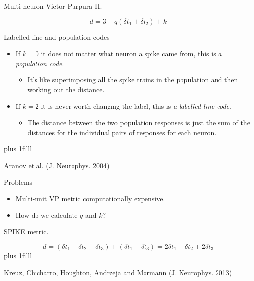 \documentclass{beamer}
\newcommand{\btVFill}{\vskip0pt plus 1filll}
\begin{document}
\begin{frame}{Multi-neuron Victor-Purpura II.}
\color{reddish}

\color{dark}
\[
d=3+q(\delta t_1+\delta t_2)+k
\]
\end{frame}



\begin{frame}{Labelled-line and population codes}
\begin{itemize}
\item If \color{dark}$k=0$\color{black}{} it does not matter what neuron a spike came from, this is \textsl{a population code}.
\begin{itemize}
\item It's like superimposing all the spike trains in the population and then working out the distance.
\end{itemize}
\item If \color{dark}$k=2$\color{black}{} it is never worth changing the label, this is \textsl{a labelled-line code}.
\begin{itemize}
\item The distance between the two population responses is just the sum of the distances for the individual pairs of responses for each neuron.
\end{itemize}
\end{itemize}
\btVFill
\begin{flushright}
\tiny{Aranov et al. (J. Neurophys. 2004)}
\end{flushright}
\end{frame}

\begin{frame}{Problems}
\begin{itemize}
\item Multi-unit VP metric computationally expensive.
\item How do we calculate \color{dark}$q$\color{black}{} and \color{dark}$k$\color{black}{}?
\end{itemize}
\end{frame}


\begin{frame}{SPIKE metric.}
\color{reddish}

\color{dark}
$$
d=(\delta t_1+\delta t_2+\delta t_3)+(\delta t_1+\delta t_3)=2\delta t_1+\delta t_2+2\delta t_3
$$
\btVFill
\begin{flushright}
\tiny{Kreuz, Chicharro, Houghton, Andrzeja and Mormann (J. Neurophys. 2013)}
\end{flushright}
\end{frame}
\end{document}
